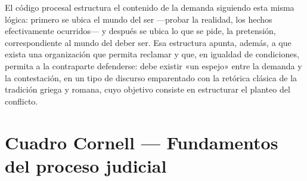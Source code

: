 \documentclass[12pt,oneside]{book}
\begin{document}
El código procesal estructura el contenido de la demanda siguiendo esta misma lógica: primero se ubica el mundo del ser —probar la realidad, los hechos efectivamente ocurridos— y después se ubica lo que se pide, la pretensión, correspondiente al mundo del deber ser. Esa estructura apunta, además, a que exista una organización que permita reclamar y que, en igualdad de condiciones, permita a la contraparte defenderse: debe existir «un espejo» entre la demanda y la contestación, en un tipo de discurso emparentado con la retórica clásica de la tradición griega y romana, cuyo objetivo consiste en estructurar el planteo del conflicto.

\section*{Cuadro Cornell — Fundamentos del proceso judicial}
\end{document}
